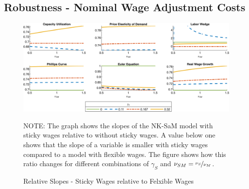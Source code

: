 \documentclass[12pt,3p,authoryear,review]{elsarticle}
\begin{document}
\subsection{Robustness - Nominal Wage Adjustment Costs}\label{sec:robust_wages}%
\begin{figure}[h!]%
    \centering%
    \caption{Relative Slopes - Sticky Wages relative to Felxible Wages}\label{fig:app_slopes_robust_sw}%
    \includegraphics[width=\textwidth]{fig_28_slopes_robust_sw.png}\\%
    {\tiny \singlespacing NOTE: The graph shows the slopes of the NK-SaM model with sticky wages relative to without sticky wages. A value below one shows that the slope of a variable is smaller with sticky wages compared to a model with flexible wages. The figure shows how this ratio changes for different combinations of $\gamma_S$ and $\nu_{SM} = \nicefrac{\nu_S}{\nu_M}$.\par}%
\end{figure}%
\end{document}
